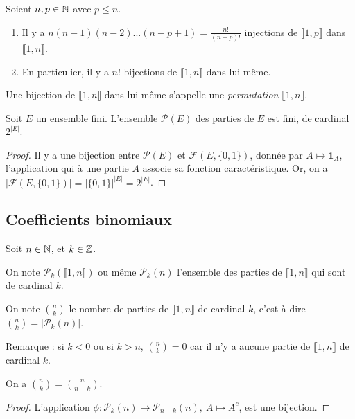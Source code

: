 \begin{proposition}
Soient $n, p\in \mathbb{N}$ avec $p\leq n$.
\begin{enumerate}
\item Il y a $n(n-1)(n-2)...(n-p+1)=\frac{n!}{(n-p)!}$ injections de $\llbracket 1,p\rrbracket$ dans $\llbracket 1,n\rrbracket$.
\item En particulier, il y a $n!$ bijections de $\llbracket 1,n\rrbracket$ dans lui-même.
\end{enumerate}
\end{proposition}

Une bijection de $\llbracket 1,n\rrbracket$ dans lui-même s'appelle une \emph{permutation} $\llbracket 1,n\rrbracket$.

\begin{proposition}
Soit $E$ un ensemble fini. L'ensemble $\mathcal P(E)$ des parties de $E$ est fini, de cardinal $2^{|E|}$.
\end{proposition}
\begin{proof}
Il y a une bijection entre $\mathcal P(E)$ et $\mathcal F(E,\{0,1\})$, donnée par $A\mapsto \mathbf{1}_A$, l'application qui à une partie $A$ associe sa fonction caractéristique. Or, on a $|\mathcal F(E,\{0,1\})| = |\{0,1\}|^{|E|} =2^{|E|} $.
\end{proof}

\subsection{Coefficients binomiaux}

\begin{definition}
Soit $n\in\mathbb{N}$, et $k\in \mathbb{Z}$. 

On note $\mathcal P_k(\llbracket 1,n\rrbracket)$ ou même $\mathcal P_k(n)$ l'ensemble des parties de $\llbracket 1,n\rrbracket$ qui sont de cardinal $k$.

On note $\binom{n}{k}$ le nombre de parties de $\llbracket 1,n\rrbracket$ de cardinal $k$, c'est-à-dire $\binom{n}{k}=|\mathcal P_k(n)|$.
\end{definition}

Remarque : si $k<0$ ou si $k>n$, $\binom{n}{k}=0$ car il n'y a aucune partie de $\llbracket 1,n\rrbracket$ de cardinal $k$.

\begin{proposition}
On a $\binom{n}{k} = \binom{n}{n-k}$.
\end{proposition}
\begin{proof}
L'application $\phi : \mathcal P_k(n) \to \mathcal P_{n-k}(n), \: A\mapsto  A^c$, est une bijection.
\end{proof}

